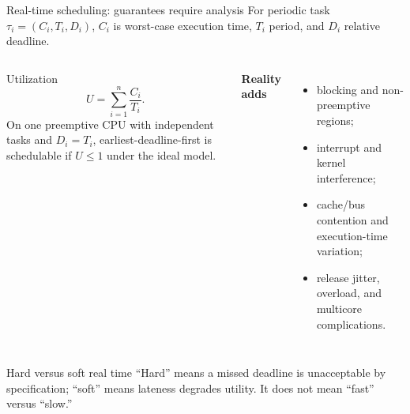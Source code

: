 \documentclass[aspectratio=169,11pt]{beamer}
\begin{document}
\begin{frame}{Real-time scheduling: guarantees require analysis}
  For periodic task $\tau_i=(C_i,T_i,D_i)$, $C_i$ is worst-case execution time, $T_i$ period, and $D_i$ relative deadline.
  \begin{columns}[T,onlytextwidth]
      \begin{block}{Utilization}
        \[
          U=\sum_{i=1}^{n}\frac{C_i}{T_i}.
        \]
        On one preemptive CPU with independent tasks and $D_i=T_i$, earliest-deadline-first is schedulable if $U\leq 1$ under the ideal model.
      \end{block}
      \textbf{Reality adds}
      \begin{itemize}
        \item blocking and non-preemptive regions;
        \item interrupt and kernel interference;
        \item cache/bus contention and execution-time variation;
        \item release jitter, overload, and multicore complications.
      \end{itemize}
  \end{columns}
  \begin{alertblock}{Hard versus soft real time}
    ``Hard'' means a missed deadline is unacceptable by specification; ``soft'' means lateness degrades utility. It does not mean ``fast'' versus ``slow.''
  \end{alertblock}
\end{frame}
\end{document}
